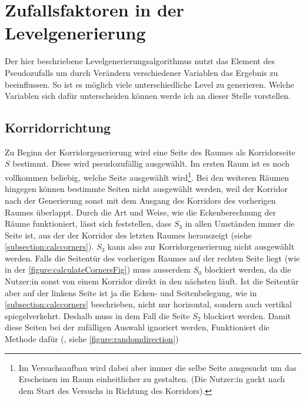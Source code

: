 \section{Zufallsfaktoren in der Levelgenerierung}
\label{sec:random}
Der hier beschriebene Levelgenerierungsalgorithmus nutzt das Element des Pseudozufalls um durch Verändern verschiedener Variablen das Ergebnis zu beeinflussen. So ist es möglich viele unterschiedliche Level zu generieren. Welche Variablen sich dafür unterscheiden können werde ich an dieser Stelle vorstellen.

\subsection{Korridorrichtung}

\begin{figure}[h!]
    \caption{}\label{figure:randomdirection}
\end{figure}
Zu Beginn der Korridorgenerierung wird eine Seite des Raumes als Korridorseite $S$ bestimmt. Diese wird pseudozufällig ausgewählt. Im ersten Raum ist es noch vollkommen beliebig, welche Seite ausgewählt wird\footnote{Im Versuchsaufbau wird dabei aber immer die selbe Seite ausgesucht um das Erscheinen im Raum einheitlicher zu gestalten. (Die Nutzer:in guckt nach dem Start des Versuchs in Richtung des Korridors).}.
Bei den weiteren Räumen hingegen können bestimmte Seiten nicht ausgewählt werden, weil der Korridor nach der Generierung sonst mit dem Ausgang des Korridors des vorherigen Raumes überlappt.
Durch die Art und Weise, wie die Eckenberechnung der Räume funktioniert, lässt sich feststellen, dass $S_3$ in allen Umständen immer die Seite ist, aus der der Korridor des letzten Raumes herauszeigt (siehe \autoref{subsection:calccorners}). $S_3$ kann also zur Korridorgenerierung nicht ausgewählt werden.
Falls die Seitentür des vorherigen Raumes auf der rechten Seite liegt (wie in der \autoref{figure:calculateCornersFig}) muss ausserdem $S_0$ blockiert werden, da die Nutzer:in sonst von einem Korridor direkt in den nächsten läuft. Ist die Seitentür aber auf der linkens Seite ist ja die Ecken- und Seitenbelegung, wie in \autoref{subsection:calccorners} beschrieben, nicht nur horizontal, sondern auch vertikal spiegelverkehrt. Deshalb muss in dem Fall die Seite $S_2$ blockiert werden.
Damit diese Seiten bei der zufälligen Auswahl ignoriert werden, Funktioniert die Methode dafür (, siehe \autoref{figure:randomdirection})
